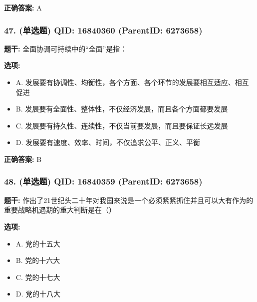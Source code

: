 \documentclass[12pt,UTF8]{ctexart}
\begin{document}
\textbf{正确答案:}
A

\vspace{0.3em}\hrulefill\vspace{0.7em}

\subsubsection*{47. (单选题) \small QID: 16840360 (ParentID: 6273658)}

\textbf{题干:}
全面协调可持续中的“全面”是指：



\textbf{选项:}
\begin{itemize}[leftmargin=*]

  \item A. 发展要有协调性、均衡性，各个方面、各个环节的发展要相互适应、相互促进

  \item B. 发展要有全面性、整体性，不仅经济发展，而且各个方面都要发展

  \item C. 发展要有持久性、连续性，不仅当前要发展，而且要保证长远发展

  \item D. 发展要有速度、效率、时间，不仅追求公平、正义、平衡

\end{itemize}

\textbf{正确答案:}
B

\vspace{0.3em}\hrulefill\vspace{0.7em}

\subsubsection*{48. (单选题) \small QID: 16840359 (ParentID: 6273658)}

\textbf{题干:}
作出了21世纪头二十年对我国来说是一个必须紧紧抓住并且可以大有作为的重要战略机遇期的重大判断是在（）



\textbf{选项:}
\begin{itemize}[leftmargin=*]

  \item A. 党的十五大

  \item B. 党的十六大

  \item C. 党的十七大

  \item D. 党的十八大

\end{itemize}
\end{document}
